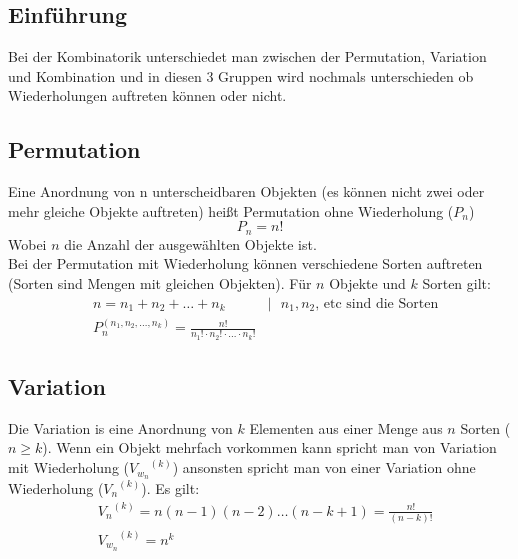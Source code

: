 \documentclass[a4paper]{scrartcl}
\begin{document}
        \subsection{Einführung}
            Bei der Kombinatorik unterschiedet man zwischen der Permutation, Variation und Kombination und in diesen 3 Gruppen wird nochmals unterschieden ob Wiederholungen auftreten 
            können oder nicht. 
        \subsection{Permutation}
            Eine Anordnung von n unterscheidbaren Objekten (es können nicht zwei oder mehr gleiche Objekte auftreten) heißt Permutation ohne Wiederholung (\(P_n\))
            \begin{equation*}
                P_n = n!
            \end{equation*} 
            Wobei \(n\) die Anzahl der ausgewählten Objekte ist. \\
            Bei der Permutation mit Wiederholung können verschiedene Sorten auftreten (Sorten sind Mengen mit gleichen Objekten). Für \(n\) Objekte und \(k\) Sorten gilt:
            \begin{equation*}
                \begin{aligned}
                    & n = n_1 + n_2 + \ldots + n_k & | \text{ \(n_1,n_2\), etc sind die Sorten} \\
                    & P_n^{(n_1,n_2, \ldots ,n_k)} = \frac{n!}{n_1! \cdot n_2! \cdot ... \cdot n_k!}
                \end{aligned}
            \end{equation*} 
        \subsection{Variation}
            Die Variation is eine Anordnung von \(k\) Elementen aus einer Menge aus \(n\) Sorten (\(n \geq k\)). Wenn ein Objekt mehrfach vorkommen kann spricht man 
            von Variation mit Wiederholung (\({V_{w_n}}^{(k)}\)) ansonsten spricht man von einer Variation ohne Wiederholung (\({V_{n}}^{(k)}\)). Es gilt:
            \begin{equation*}
                \begin{aligned}
                    & {V_{n}}^{(k)} = n(n-1)(n-2) \ldots (n-k+1) = \frac{n!}{(n-k)!} \\
                    & {V_{w_n}}^{(k)} = n^k 
                \end{aligned}
            \end{equation*}
\end{document}
